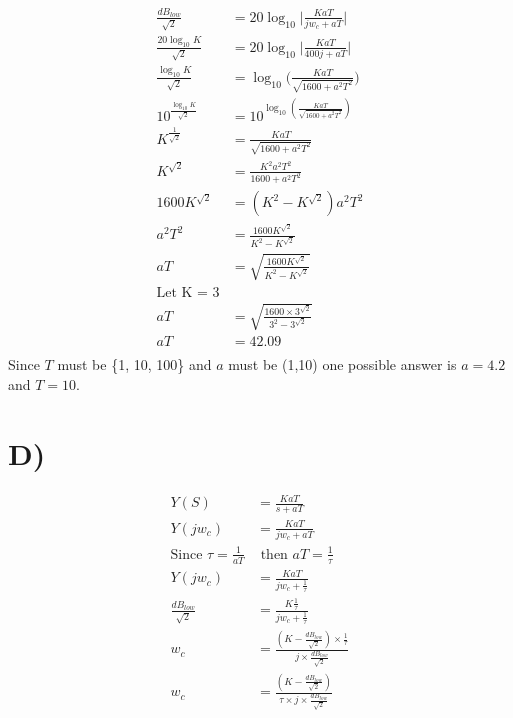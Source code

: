 \documentclass{report}
\begin{document}
\begin{align*}
    \frac{dB_{low}}{\sqrt{2}} &= 20\log_{10}\bigg|\frac{KaT}{jw_c + aT}\bigg|\\
    \frac{20\log_{10}K}{\sqrt{2}} &= 20\log_{10}\bigg|\frac{KaT}{400j + aT}\bigg|\\
    \frac{\log_{10}K}{\sqrt{2}} &= \log_{10}\bigg(\frac{KaT}{\sqrt{1600 + a^2T^2}}\bigg)\\
    10^\frac{\log_{10}K}{\sqrt{2}} &= 10^{\log_{10}(\frac{KaT}{\sqrt{1600 + a^2T^2 }})}\\
    K^{\frac{1}{\sqrt{2}}} &= \frac{KaT}{\sqrt{1600 + a^2T^2}}\\
    K^{\sqrt{2}} &= \frac{K^2a^2T^2}{1600 + a^2T^2}\\
    1600K^{\sqrt{2}} &= (K^2 - K^{\sqrt{2}})a^2T^2\\
    a^2T^2 &= \frac{1600K^{\sqrt{2}}}{K^2 - K^{\sqrt{2}}}\\
    aT &= \sqrt{\frac{1600K^{\sqrt{2}}}{K^2 - K^{\sqrt{2}}}}\\
    \text{Let K = 3}\\
    aT &= \sqrt{\frac{1600\times 3^{\sqrt{2}}}{3^2 - 3^{\sqrt{2}}}}\\
    aT &= 42.09\\
\end{align*}
Since $T$ must be \{1, 10, 100\} and $a$ must be (1,10) one possible answer is $a = 4.2$ and $T = 10$.

\section*{D)} %
\label{sec:d_}
\begin{align*}
    Y(S) &= \frac{KaT}{s + aT}\\
    Y(jw_c) &= \frac{KaT}{jw_c + aT}\\
    \text{Since } \tau = \frac{1}{aT} & \text{ then } aT=\frac{1}{\tau}\\
    Y(jw_c) &= \frac{KaT}{jw_c + \frac{1}{\tau}}\\
    \frac{dB_{low}}{\sqrt{2}} &= \frac{K\frac{1}{\tau}}{jw_c + \frac{1}{\tau}}\\
    w_c &= \frac{(K-\frac{dB_{low}}{\sqrt{2}})\times\frac{1}{\tau}}{j\times\frac{dB_{low}}{\sqrt{2}}}\\
    w_c &= \frac{(K-\frac{dB_{low}}{\sqrt{2}})}{\tau \times j\times\frac{dB_{low}}{\sqrt{2}}}\\
\end{align*}
\end{document}
